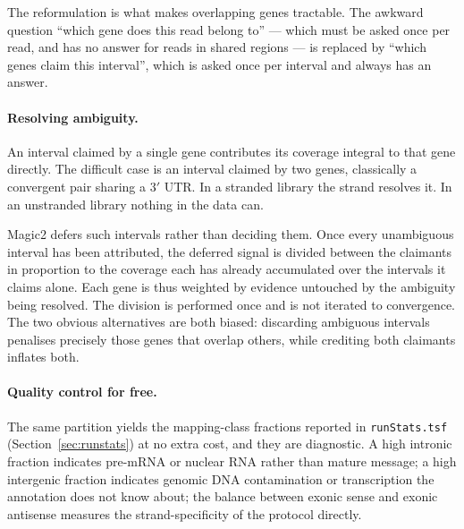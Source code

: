\documentclass[11pt]{article}
\begin{document}
The reformulation is what makes overlapping genes tractable.
The awkward question ``which gene does this read belong to'' --- which
must be asked once per read, and has no answer for reads in shared
regions --- is replaced by ``which genes claim this interval'', which is
asked once per interval and always has an answer.

\paragraph{Resolving ambiguity.}
An interval claimed by a single gene contributes its coverage integral
to that gene directly.
The difficult case is an interval claimed by two genes, classically a
convergent pair sharing a 3$'$ UTR.
In a stranded library the strand resolves it.
In an unstranded library nothing in the data can.

Magic2 defers such intervals rather than deciding them.
Once every unambiguous interval has been attributed, the deferred signal
is divided between the claimants in proportion to the coverage each has
already accumulated over the intervals it claims alone.
Each gene is thus weighted by evidence untouched by the ambiguity being
resolved.
The division is performed once and is not iterated to convergence.
The two obvious alternatives are both biased: discarding ambiguous
intervals penalises precisely those genes that overlap others, while
crediting both claimants inflates both.

\paragraph{Quality control for free.}
The same partition yields the mapping-class fractions reported in
\texttt{runStats.tsf} (Section~\ref{sec:runstats}) at no extra cost,
and they are diagnostic.
A high intronic fraction indicates pre-mRNA or nuclear RNA rather than
mature message; a high intergenic fraction indicates genomic DNA
contamination or transcription the annotation does not know about; the
balance between exonic sense and exonic antisense measures the
strand-specificity of the protocol directly.
\end{document}

